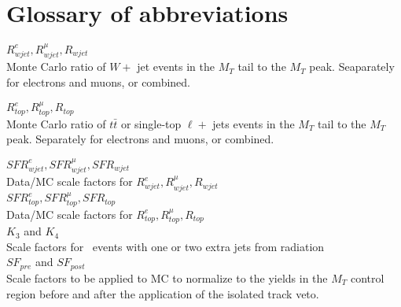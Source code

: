 \section{Glossary of abbreviations}

$R^{e}_{wjet}, R^{\mu}_{wjet}, R_{wjet}$ \\
Monte Carlo ratio of $W +$ jet events in the $M_T$ tail to the $M_T$ peak.
Seaparately for electrons and muons, or combined.

$R^{e}_{top}, R^{\mu}_{top}, R_{top}$ \\
Monte Carlo ratio of $t\bar{t}$ or single-top $\ell +$ jets events in the $M_T$ tail to the $M_T$ peak.
Separately for electrons and muons, or combined.

$SFR^{e}_{wjet}, SFR^{\mu}_{wjet}, SFR_{wjet}$ \\
Data/MC scale factors for $R^{e}_{wjet}, R^{\mu}_{wjet}, R_{wjet}$ \\

$SFR^{e}_{top}, SFR^{\mu}_{top}, SFR_{top}$ \\
Data/MC scale factors for $R^{e}_{top}, R^{\mu}_{top}, R_{top} $\\

$K_3$ and $K_4$ \\
Scale factors for \ttdl\ events with one or two extra jets from
radiation \\

$SF_{pre}$ and $SF_{post}$ \\
Scale factors to be applied to MC to normalize to the yields in the 
$M_T$ control region before and after the application of the isolated
track veto.

